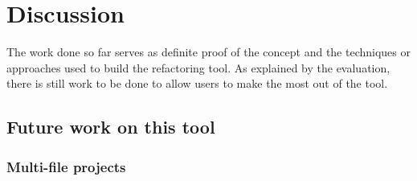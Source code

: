 \chapter{Discussion}\label{C:future}

The work done so far serves as definite proof of the concept and the techniques or approaches used to build the refactoring tool. As explained by the evaluation, there is still work to be done to allow users to make the most out of the tool.



\section{Future work on this tool}
\subsection{Multi-file projects}


